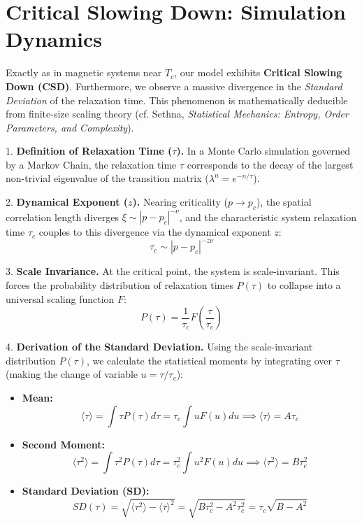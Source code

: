 \documentclass[11pt]{article}
\begin{document}
\section{Critical Slowing Down: Simulation Dynamics}
Exactly as in magnetic systems near $T_c$, our model exhibits \textbf{Critical Slowing Down (CSD)}. Furthermore, we observe a massive divergence in the \textit{Standard Deviation} of the relaxation time. This phenomenon is mathematically deducible from finite-size scaling theory (cf. Sethna, \textit{Statistical Mechanics: Entropy, Order Parameters, and Complexity}). 

1. \textbf{Definition of Relaxation Time ($\tau$).} In a Monte Carlo simulation governed by a Markov Chain, the relaxation time $\tau$ corresponds to the decay of the largest non-trivial eigenvalue of the transition matrix ($\lambda^n = e^{-n/\tau}$).

2. \textbf{Dynamical Exponent ($z$).} Nearing criticality ($p \to p_c$), the spatial correlation length diverges $\xi \sim |p - p_c|^{-\nu}$, and the characteristic system relaxation time $\tau_c$ couples to this divergence via the dynamical exponent $z$:
\begin{equation}
    \tau_c \sim |p - p_c|^{-z\nu}
\end{equation}

3. \textbf{Scale Invariance.} At the critical point, the system is scale-invariant. This forces the probability distribution of relaxation times $P(\tau)$ to collapse into a universal scaling function $F$:
\begin{equation}
    P(\tau) = \frac{1}{\tau_c} F\left(\frac{\tau}{\tau_c}\right)
\end{equation}

4. \textbf{Derivation of the Standard Deviation.} Using the scale-invariant distribution $P(\tau)$, we calculate the statistical moments by integrating over $\tau$ (making the change of variable $u = \tau/\tau_c$):
\begin{itemize}
    \item \textbf{Mean:} 
    \begin{equation}
       \langle \tau \rangle = \int \tau P(\tau) d\tau = \tau_c \int u F(u) du \implies \langle \tau \rangle = A \tau_c
    \end{equation}
    \item \textbf{Second Moment:} 
    \begin{equation}
       \langle \tau^2 \rangle = \int \tau^2 P(\tau) d\tau = \tau_c^2 \int u^2 F(u) du \implies \langle \tau^2 \rangle = B \tau_c^2
    \end{equation}
    \item \textbf{Standard Deviation (SD):}
    \begin{equation}
       SD(\tau) = \sqrt{\langle \tau^2 \rangle - \langle \tau \rangle^2} = \sqrt{B \tau_c^2 - A^2 \tau_c^2} = \tau_c \sqrt{B - A^2}
    \end{equation}
\end{itemize}
\end{document}
